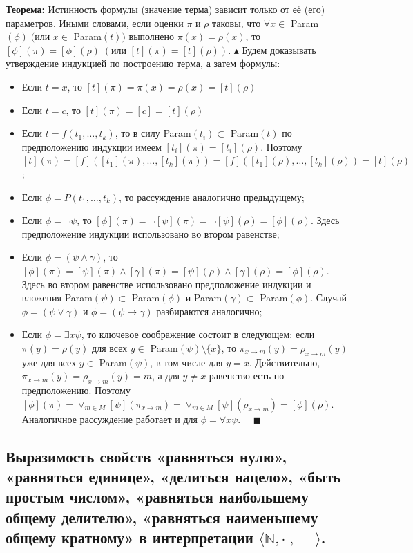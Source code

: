 \textbf{Теорема:} Истинность формулы (значение терма) зависит только от её (его) параметров. Иными словами, если оценки $\pi$ и $\rho$ таковы, что $\forall x \in $ Param$(\phi) \;
(\text{или }x \in $ Param$(t))$ выполнено $\pi(x) = \rho(x)$, то $[\phi](\pi) = [\phi](\rho) \; (\text{или }[t](\pi) = [t](\rho))$.
\newline $\blacktriangle$ Будем доказывать утверждение индукцией по построению терма, а затем формулы:
\begin{itemize}
    \item Если $t = x$, то $[t](\pi) = \pi(x) = \rho(x) = [t](\rho)$
    \item Если $t = c$, то $[t](\pi) = [c] = [t](\rho)$
    \item Если $t = f(t_1,\ldots, t_k)$, то в силу Param$(t_i) \subset$ Param$(t)$ по предположению индукции имеем $[t_i](\pi) = [t_i](\rho)$. Поэтому $[t](\pi) = [f]([t_1](\pi),\ldots, [t_k](\pi)) = [f]([t_1](\rho),\ldots, [t_k](\rho)) = [t](\rho)$;
    \item Если $\phi = P(t_1,\ldots, t_k)$, то рассуждение аналогично предыдущему;
    \item Если $\phi = \neg\psi$, то $[\phi](\pi) = \neg[\psi](\pi) = \neg[\psi](\rho) = [\phi](\rho)$. Здесь предположение индукции использовано во втором равенстве;
    \item Если $\phi = (\psi \land\gamma)$, то $[\phi](\pi) = [\psi](\pi) \land [\gamma](\pi) = [\psi](\rho) \land [\gamma](\rho) = [\phi](\rho)$. Здесь во втором равенстве использовано предположение индукции и вложения Param$(\psi) \subset$ Param$(\phi)$ и Param$(\gamma) \subset$ Param$(\phi)$. Случай $\phi = (\psi \lor\gamma)$ и $\phi = (\psi \to\gamma)$ разбираются аналогично;
    \item Если $\phi = \exists x\psi$, то ключевое соображение состоит в следующем: если $\pi(y) = \rho(y)$ для всех $y \in$ Param$(\psi) \setminus \{x\}$, то $\pi_{x\to m}(y) = \rho_{x\to m}(y)$ уже для всех $y \in$ Param$(\psi)$, в том числе для $y = x$. Действительно, $\pi_{x\to m}(y) = \rho_{x\to m}(y) = m$, а для $y\neq x$ равенство есть по предположению. Поэтому $[\phi](\pi) = \lor_{m\in M}[\psi](\pi_{x\to m}) = \lor_{m\in M}[\psi](\rho_{x\to m})=[\phi](\rho)$. Аналогичное рассуждение работает и для $\phi = \forall x\psi$. $\quad \blacksquare$
\end{itemize}

\subsection{Выразимость свойств «равняться нулю», «равняться единице», «делиться нацело», «быть простым числом», «равняться наибольшему общему делителю», «равняться наименьшему общему кратному» в интерпретации $\langle\mathbb{N},\cdot\;,=\rangle$.}

